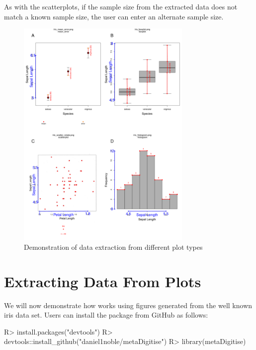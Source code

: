 \documentclass[article]{jss}
\newcommand{\fct}[1]{\code{#1()}}
\begin{document}
As with the scatterplots, if the sample size from the extracted data does not match a known sample size, the user can enter an alternate sample size.


\begin{figure}[!h]
\centering 
 \includegraphics[width=0.75\textwidth]{fig_all_extract.pdf} 
 \caption{Demonstration of data extraction from different plot types}
\label{fig:all_extract}
\end{figure}



\section{Extracting Data From Plots}


We will now demonstrate how \fct{metaDigitise} works using figures generated from the well known iris data set. Users can install the  package from GitHub as follows:

\begin{CodeChunk}
\begin{CodeInput}
R> install.packages("devtools")
R> devtools::install_github("daniel1noble/metaDigitise")
R> library(metaDigitise)
\end{CodeInput}
\end{CodeChunk}
\end{document}
